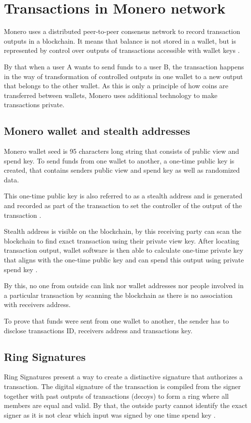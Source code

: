 \documentclass[
  printed, %
  table,   %
  lof,     %
  lot,     %
           oneside, color
]{fithesis3}
\begin{document}
\section{Transactions in Monero network}
Monero uses a distributed peer-to-peer consensus network to record transaction outputs in a blockchain. It means that balance is not stored in a wallet, but is represented by control over outputs of transactions accessible with wallet keys \cite{seguias2018moneroa}.

By that when a user A wants to send funds to a user B, the transaction happens in the way of transformation of controlled outputs in one wallet to a new output that belongs to the other wallet. As this is only a principle of how coins are transferred between wallets, Monero uses additional technology to make transactions private.
\subsection{Monero wallet and stealth addresses}
\label{sec:stealthaddresses}
Monero wallet seed is 95 characters long string that consists of public view and spend key. To send funds from one wallet to another, a one-time public key is created, that contains senders public view and spend key as well as randomized data. 

This one-time public key is also referred to as a stealth address and is generated and recorded as part of the transaction to set the controller of the output of the transaction \cite{seguias2018monero}.

Stealth address is visible on the blockchain, by this receiving party can scan the blockchain to find exact transaction using their private view key. After locating transaction output, wallet software is then able to calculate one-time private key that aligns with the one-time public key and can spend this output using private spend key \cite{courtois2017stealth}.

By this, no one from outside can link nor wallet addresses nor people involved in a particular transaction by scanning the blockchain as there is no association with receivers address.

To prove that funds were sent from one wallet to another, the sender has to disclose transactions ID, receivers address and transactions key.

\subsection{Ring Signatures}
\label{sec:ringsignatures}
Ring Signatures present a way to create a distinctive signature that authorizes a transaction. The digital signature of the transaction is compiled from the signer together with past outputs of transactions (decoys) to form a ring where all members are equal and valid. By that, the outside party cannot identify the exact signer as it is not clear which input was signed by one time spend key \cite{mercer2016privacy}.
\end{document}
